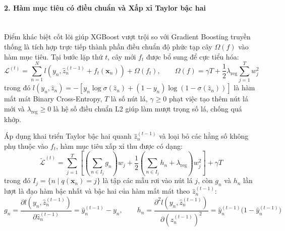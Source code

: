 \paragraph{2. Hàm mục tiêu có điều chuẩn và Xấp xỉ Taylor bậc hai}\mbox{}\\
Điểm khác biệt cốt lõi giúp XGBoost vượt trội so với Gradient Boosting truyền thống là tích hợp trực tiếp thành phần điều chuẩn độ phức tạp cây $\Omega(f)$ vào hàm mục tiêu. Tại bước lặp thứ $t$, cây mới $f_t$ được bổ sung để cực tiểu hóa:
\begin{equation}
    \mathcal{L}^{(t)} = \sum_{n=1}^{N} l\!\left(y_n, \hat{z}_n^{(t-1)} + f_t(\mathbf{x}_n)\right) + \Omega(f_t), \qquad \Omega(f) = \gamma T + \frac{1}{2}\lambda_{\text{reg}} \sum_{j=1}^{T} w_j^2
\end{equation}
trong đó $l(y_n, \hat{z}_n) = -\left[y_n \log\sigma(\hat{z}_n) + (1 - y_n)\log(1 - \sigma(\hat{z}_n))\right]$ là hàm mất mát Binary Cross-Entropy, $T$ là số nút lá, $\gamma \ge 0$ phạt việc tạo thêm nút lá mới và $\lambda_{\text{reg}} \ge 0$ là hệ số điều chuẩn L2 giúp làm mượt trọng số lá, chống quá khớp.

Áp dụng khai triển Taylor bậc hai quanh $\hat{z}_n^{(t-1)}$ và loại bỏ các hằng số không phụ thuộc vào $f_t$, hàm mục tiêu xấp xỉ thu được có dạng:
\begin{equation}
    \tilde{\mathcal{L}}^{(t)} = \sum_{j=1}^{T} \left[ \left(\sum_{n \in I_j} g_n\right) w_j + \frac{1}{2}\left(\sum_{n \in I_j} h_n + \lambda_{\text{reg}}\right) w_j^2 \right] + \gamma T
\end{equation}
trong đó $I_j = \{n \mid q(\mathbf{x}_n) = j\}$ là tập các mẫu rơi vào nút lá $j$, còn $g_n$ và $h_n$ lần lượt là đạo hàm bậc nhất và bậc hai của hàm mất mát theo $\hat{z}_n^{(t-1)}$:
\begin{equation}
    g_n = \frac{\partial l(y_n, \hat{z}_n^{(t-1)})}{\partial \hat{z}_n^{(t-1)}} = \hat{y}_n^{(t-1)} - y_n, \qquad h_n = \frac{\partial^2 l(y_n, \hat{z}_n^{(t-1)})}{\partial (\hat{z}_n^{(t-1)})^2} = \hat{y}_n^{(t-1)}\big(1 - \hat{y}_n^{(t-1)}\big)
\end{equation}

